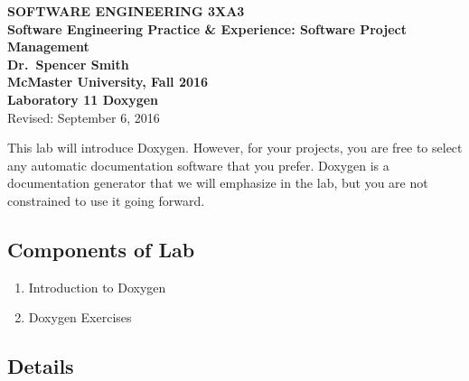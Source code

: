 \documentclass[12pt,fleqn]{article}
\newcommand{\be}{\begin{enumerate}}
\newcommand{\ee}{\end{enumerate}}
\newcommand{\bc}{\begin{center}}
\newcommand{\ec}{\end{center}}
\begin{document}
\bc
{\Large \textbf{SOFTWARE ENGINEERING 3XA3}}\\[2mm]
{\large \textbf{Software Engineering Practice \& Experience: Software Project
Management }}\\[6mm]
{\large \textbf{Dr.~Spencer Smith}}\\[2mm]
{\large \textbf{McMaster University, Fall 2016}}\\[6mm]
{\LARGE \textbf{Laboratory 11 Doxygen}}\\[4mm]
{\large Revised: September 6, 2016}
\ec
\medskip
\noindent
This lab will introduce Doxygen. However, for your projects, you are free to
select any automatic
documentation software that you prefer. Doxygen is a documentation generator
that
we will emphasize in the lab, but you are not constrained to use it going
forward.
\subsection*{Components of Lab}
\be
\item Introduction to Doxygen
\item Doxygen Exercises
\ee
\subsection*{Details}
%
%

%




\end{document}
